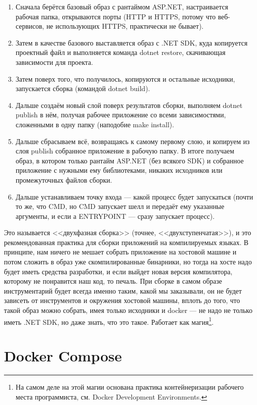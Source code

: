 \documentclass[a5paper]{article}
\begin{document}
\begin{enumerate}
    \item Сначала берётся базовый образ с рантаймом ASP.NET, настраивается рабочая папка, открываются порты (HTTP и HTTPS, потому что веб-сервисов, не использующих HTTPS, практически не бывает).
    \item Затем в качестве базового выставляется образ с .NET SDK, куда копируется проектный файл и выполняется команда dotnet restore, скачивающая зависимости для проекта. 
    \item Затем поверх того, что получилось, копируются и остальные исходники, запускается сборка (командой dotnet build).
    \item Дальше создаём новый слой поверх результатов сборки, выполняем dotnet publish в нём, получая рабочее приложение со всеми зависимостями, сложенными в одну папку (наподобие make install).
    \item Дальше сбрасываем всё, возвращаясь к самому первому слою, и копируем из слоя publish собранное приложение в рабочую папку. В итоге получаем образ, в котором только рантайм ASP.NET (без всякого SDK) и собранное приложение с нужными ему библиотеками, никаких исходников или промежуточных файлов сборки.
    \item Дальше устанавливаем точку входа --- какой процесс будет запускаться (почти то же, что CMD, но CMD запускает шелл и передаёт ему указанные аргументы, и если а ENTRYPOINT --- сразу запускает процесс).
\end{enumerate}

Это называется <<двухфазная сборка>> (точнее, <<двухступенчатая>>), и это рекомендованная практика для сборки приложений на компилируемых языках. В принципе, нам ничего не мешает собрать приложение на хостовой машине и потом сложить в образ уже скомпилированные бинарники, но тогда на хосте надо будет иметь средства разработки, и если выйдет новая версия компилятора, которому не понравится наш код, то печаль. При сборке в самом образе инструментарий будет всегда именно таким, какой мы заказывали, он не будет зависеть от инструментов и окружения хостовой машины, вплоть до того, что такой образ можно собрать, имея только исходники и docker --- не надо не только иметь .NET SDK, но даже знать, что это такое. Работает как магия\footnote{На самом деле на этой магии основана практика контейнеризации рабочего места программиста, см. Docker Development Environments.}.

\section{Docker Compose}
\end{document}
